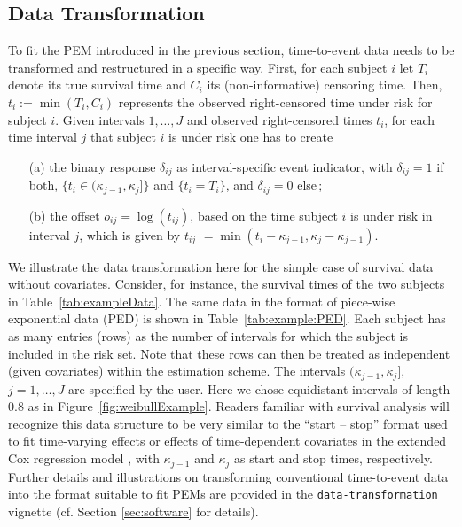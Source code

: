 \documentclass[submit]{smj}
\begin{document}
\subsection{Data Transformation}\label{ssec:DataTrafo}
To fit the PEM introduced in the previous section, time-to-event data needs
to be transformed and restructured in a specific way.
First, for each subject $i$ let $T_i$ denote its true survival time and $C_i$
its (non-informative) censoring time. Then, $t_i:=\min(T_i, C_i)$ represents the
observed right-censored time under risk for subject $i$. Given intervals
$1,\ldots, J$ and observed right-censored times $t_i$, for each time interval
$j$ that subject $i$ is under risk one has to create
\begin{enumerate}
\item[(a)] the binary response $\delta_{ij}$ as interval-specific event indicator, with $\delta_{ij}=1$ if both, $\{t_i \in (\kappa_{j-1}, \kappa_j]\}$ and
$\{t_i = T_i\}$, and $\delta_{ij}=0$ else\,;
\item[(b)] the offset $o_{ij}=\log(t_{ij})$, based on the time subject $i$ is
under risk in interval $j$, which is given by
$t_{ij}$ $=\min(t_i - \kappa_{j-1}, \kappa_{j} - \kappa_{j-1})$.
\end{enumerate}
We illustrate the data transformation here for the simple case of survival
data without covariates.
Consider, for instance, the survival times of the two subjects %
in Table~\ref{tab:exampleData}. The same data in the format of
piece-wise exponential data (PED) is shown in Table~\ref{tab:example:PED}.
Each subject has as many entries (rows) as the number of intervals for which
the subject is included in the risk set. Note that these rows
can then be treated as independent (given covariates) within the estimation scheme. The intervals $(\kappa_{j-1}, \kappa_j]$,
$j=1,\ldots, J$ are specified by the user. Here we chose equidistant intervals
of length $0.8$ as in Figure~\ref{fig:weibullExample}. Readers familiar with
survival analysis will recognize this data structure to be very similar to the
``start -- stop'' format used to fit time-varying effects or effects of
time-dependent covariates in the extended Cox regression model \citep{Thomas2014},
with $\kappa_{j-1}$ and $\kappa_j$ as start and stop times, respectively.
Further details and illustrations on transforming conventional time-to-event data
into the format suitable to fit PEMs are provided in the \texttt{data-transformation}
vignette (cf. Section \ref{sec:software} for details).
\end{document}
